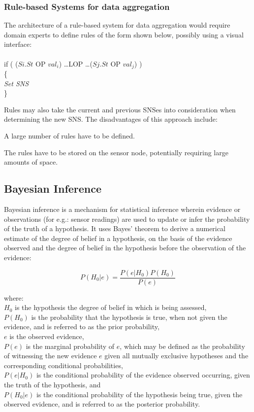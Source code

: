 \documentclass{sig-alternate-10pt}
\begin{document}
\subsubsection{Rule-based Systems for data aggregation}

The architecture of a rule-based system for data aggregation would require
domain experts to define rules of the form shown below, possibly using a visual
interface:\\ \\ \noindent
if ( ($Si.St$ OP $val_i$) \ldots LOP \ldots ($Sj.St$ OP $val_j$) ) \\
\{ \\
\hspace*{4 mm} \emph{Set SNS} \\
\}   
 
Rules may also take the current and previous SNSes into consideration when
determining the new SNS. The disadvantages of this approach include:  
\begin{compactitem}
 \item A large number of rules have to be defined. 
 \item The rules have to be stored on the
sensor node, potentially requiring large amounts of space.
\end{compactitem}

\subsection{Bayesian Inference}

Bayesian inference is a mechanism for statistical inference wherein evidence or
observations (for e.g.: sensor readings) are used to update or infer the
probability of the truth of a hypothesis. It uses Bayes' theorem to derive a
numerical estimate of the degree of belief in a hypothesis, on the basis of the
evidence observed and the degree of belief in the hypothesis before the
observation of the evidence:

\begin{equation} \label{eqn:Bayes}
	P(H_{0}|e) = \frac{P(e|H_{0})P(H_{0})}{P(e)}
\end{equation} 

\noindent
where:\\
\noindent
$H_{0}$ is the hypothesis the degree of belief in which is being assessed,\\
\noindent
$P(H_{0})$ is the probability that the hypothesis is true, when not given the
evidence, and is referred to as the prior probability,\\
\noindent 
 $e$ is the observed evidence,\\
 \noindent
 $P(e)$ is the marginal probability of $e$, which may be defined as the probability of witnessing the new evidence $e$ given all mutually exclusive hypotheses and the corresponding conditional probabilities, \\
\noindent
$P(e|H_{0})$ is the conditional probability of the evidence observed occurring,
given the truth of the hypothesis, and\\
\noindent
$P(H_{0}|e)$ is the conditional probability of the hypothesis being true, given
the observed evidence, and is referred to as the posterior probability.
\end{document}
